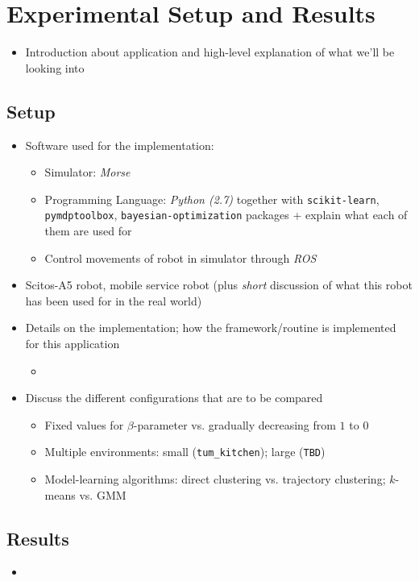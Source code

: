 \chapter{Experimental Setup and Results}
\label{ch:experimental-results}

\begin{itemize}
	\item Introduction about application and high-level explanation of what we'll be looking into
\end{itemize}

\section{Setup}
\label{sec:setup}

\begin{itemize}
	\item Software used for the implementation:
	\begin{itemize}
		\item Simulator: \textit{Morse}
		\item Programming Language: \textit{Python (2.7)} together with \texttt{scikit-learn}, \texttt{pymdptoolbox}, \texttt{bayesian-optimization} packages + explain what each of them are used for
		\item Control movements of robot in simulator through \textit{ROS}
	\end{itemize}
	\item Scitos-A5 robot, mobile service robot (plus \textit{short} discussion of what this robot has been used for in the real world)
	\item Details on the implementation; how the framework/routine is implemented for this application
	\begin{itemize}
		\item 
	\end{itemize}
	\item Discuss the different configurations that are to be compared
	\begin{itemize}
		\item Fixed values for $\beta$-parameter vs. gradually decreasing from $1$ to $0$
		\item Multiple environments: small (\texttt{tum\_kitchen}); large (\texttt{TBD})
		\item Model-learning algorithms: direct clustering vs. trajectory clustering; $k$-means vs. GMM
	\end{itemize}
\end{itemize}

\section{Results}
\label{sec:results}

\begin{itemize}
	\item 
\end{itemize}

